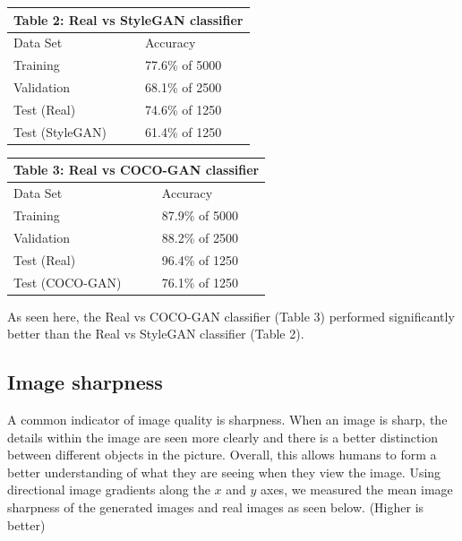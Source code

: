 \documentclass{article}
\begin{document}
        \begin{multicols}{2}
            \begin{tabular}{ |p{3cm}|p{2cm}|  }
                 \hline
                 \multicolumn{2}{|c|}{Table 2: Real vs StyleGAN classifier} \\
                 \hline
                Data Set     & Accuracy\\
                 \hline
                Training        & 77.6\% of 5000 \\
                 \hline
                Validation      & 68.1\% of 2500 \\
                 \hline
                Test (Real)     & 74.6\% of 1250 \\
                 \hline
                Test (StyleGAN) & 61.4\% of 1250  \\
                 \hline
            \end{tabular}
        
            \begin{tabular}{ |p{3cm}|p{2cm}|  }
                 \hline
                 \multicolumn{2}{|c|}{Table 3: Real vs COCO-GAN classifier} \\
                 \hline
                Data Set     & Accuracy\\
                 \hline
                Training        & 87.9\% of 5000 \\
                 \hline
                Validation      & 88.2\% of 2500 \\
                 \hline
                Test (Real)     & 96.4\% of 1250 \\
                 \hline
                Test (COCO-GAN) & 76.1\% of 1250 \\
                 \hline
            \end{tabular}
        \end{multicols}
            
        As seen here, the Real vs COCO-GAN classifier (Table 3) performed significantly better than the Real vs StyleGAN classifier (Table 2).
        \subsection{Image sharpness}
        \label{subsec:imageSharpness}
        A common indicator of image quality is sharpness.
        When an image is sharp, the details within the image are seen more clearly and there is a better distinction between different objects in the picture.
        Overall, this allows humans to form a better understanding of what they are seeing when they view the image.
        Using directional image gradients along the $x$ and $y$ axes, we measured the mean image sharpness of the generated images and real images as seen below. (Higher is better)
        
\end{document}

